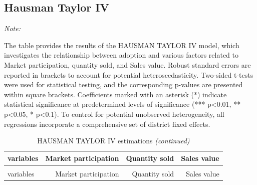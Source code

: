 \documentclass[
]{article}
\begin{document}
\hypertarget{hausman-taylor-iv}{%
\subsection{Hausman Taylor IV}\label{hausman-taylor-iv}}

\begingroup\fontsize{7}{9}\selectfont

\begin{ThreePartTable}
\begin{TableNotes}[para]
\item \textit{Note: } 
\item The table provides the results of the HAUSMAN TAYLOR IV model, which investigates the relationship between adoption and various factors related to Market participation, quantity sold, and Sales value. Robust standard errors are reported in brackets to account for potential heteroscedasticity. Two-sided t-tests were used for statistical testing, and the corresponding p-values are presented within square brackets. Coefficients marked with an asterisk (*) indicate statistical significance at predetermined levels of significance (*** p<0.01, ** p<0.05, * p<0.1). To control for potential unobserved heterogeneity, all regressions incorporate a comprehensive set of district fixed effects.
\end{TableNotes}
\begin{longtable}[t]{lrrr}
\caption{\label{tab:unnamed-chunk-15}HAUSMAN TAYLOR IV estimations}\\
\toprule
variables & Market participation & Quantity sold & Sales value\\
\midrule
\endfirsthead
\caption[]{\label{tab:unnamed-chunk-15}HAUSMAN TAYLOR IV estimations \textit{(continued)}}\\
\toprule
variables & Market participation & Quantity sold & Sales value\\
\midrule
\endhead


\end{longtable}
\end{ThreePartTable}
\end{document}
